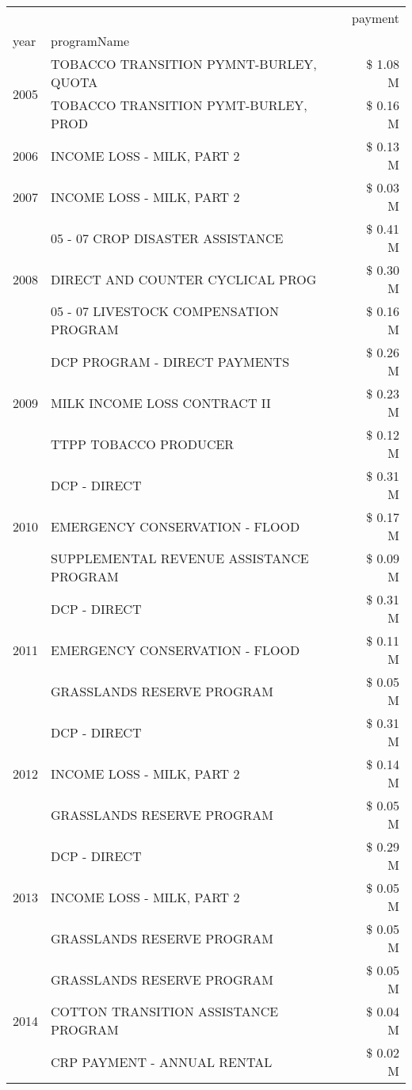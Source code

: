 \begin{tabular}{llr}
\toprule
 &  & payment \\
year & programName &  \\
\midrule
\multirow[t]{2}{*}{2005} & TOBACCO TRANSITION PYMNT-BURLEY, QUOTA & \$ 1.08 M \\
 & TOBACCO TRANSITION PYMT-BURLEY, PROD & \$ 0.16 M \\
\cline{1-3}
2006 & INCOME LOSS - MILK, PART 2 & \$ 0.13 M \\
\cline{1-3}
2007 & INCOME LOSS - MILK, PART 2 & \$ 0.03 M \\
\cline{1-3}
\multirow[t]{3}{*}{2008} & 05 - 07 CROP DISASTER ASSISTANCE & \$ 0.41 M \\
 & DIRECT AND COUNTER CYCLICAL PROG & \$ 0.30 M \\
 & 05 - 07 LIVESTOCK COMPENSATION PROGRAM & \$ 0.16 M \\
\cline{1-3}
\multirow[t]{3}{*}{2009} & DCP PROGRAM - DIRECT PAYMENTS & \$ 0.26 M \\
 & MILK INCOME LOSS CONTRACT II & \$ 0.23 M \\
 & TTPP TOBACCO PRODUCER & \$ 0.12 M \\
\cline{1-3}
\multirow[t]{3}{*}{2010} & DCP - DIRECT & \$ 0.31 M \\
 & EMERGENCY CONSERVATION - FLOOD & \$ 0.17 M \\
 & SUPPLEMENTAL REVENUE ASSISTANCE PROGRAM & \$ 0.09 M \\
\cline{1-3}
\multirow[t]{3}{*}{2011} & DCP - DIRECT & \$ 0.31 M \\
 & EMERGENCY CONSERVATION - FLOOD & \$ 0.11 M \\
 & GRASSLANDS RESERVE PROGRAM & \$ 0.05 M \\
\cline{1-3}
\multirow[t]{3}{*}{2012} & DCP - DIRECT & \$ 0.31 M \\
 & INCOME LOSS - MILK, PART 2 & \$ 0.14 M \\
 & GRASSLANDS RESERVE PROGRAM & \$ 0.05 M \\
\cline{1-3}
\multirow[t]{3}{*}{2013} & DCP - DIRECT & \$ 0.29 M \\
 & INCOME LOSS - MILK, PART 2 & \$ 0.05 M \\
 & GRASSLANDS RESERVE PROGRAM & \$ 0.05 M \\
\cline{1-3}
\multirow[t]{3}{*}{2014} & GRASSLANDS RESERVE PROGRAM & \$ 0.05 M \\
 & COTTON TRANSITION ASSISTANCE PROGRAM & \$ 0.04 M \\
 & CRP PAYMENT - ANNUAL RENTAL & \$ 0.02 M \\

\end{tabular}
